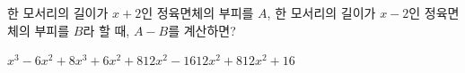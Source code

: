 한 모서리의 길이가 $x+2$인 정육면체의 부피를 $A$, 한 모서리의 길이가 $x-2$인 정육면체의 부피를 $B$라 할 때, $A-B$를 계산하면?
\begin{choicesii}{$x^3-6x^2+8$}{$x^3+6x^2+8$}{$12x^2-16$}{$12x^2+8$}{$12x^2+16$}\end{choicesii}
